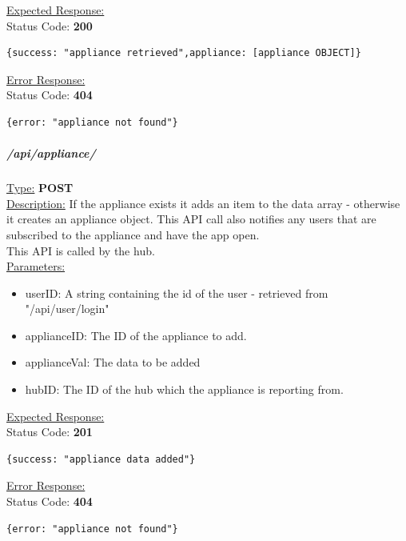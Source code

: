 \documentclass[preprint,12pt,3p]{elsarticle}
\newcommand{\forceindent}{\leavevmode{\parindent=1em\indent}}
\begin{document}
\underline{Expected Response:}\\[5pt]
\forceindent Status Code: \textbf{200} \\
\begin{verbatim}
{success: "appliance retrieved",appliance: [appliance OBJECT]}
\end{verbatim}
\underline{Error Response:}\\[5pt]
\forceindent Status Code: \textbf{404} \\
\begin{verbatim}
{error: "appliance not found"}
\end{verbatim}

\subparagraph*{/api/appliance/}
\underline{Type:} \textbf{POST}\\

\underline{Description:} If the appliance exists it adds an item to the data array - otherwise it creates an appliance object. This API call also notifies any users that are subscribed to the appliance and have the app open.\\
This API is called by the hub.\\

\underline{Parameters:}
\begin{itemize}
\item userID: A string containing the id of the user - retrieved from "/api/user/login"

\item applianceID: The ID of the appliance to add.

\item applianceVal: The data to be added

\item hubID: The ID of the hub which the appliance is reporting from.

\end{itemize}

\underline{Expected Response:}\\[5pt]
\forceindent Status Code: \textbf{201} \\
\begin{verbatim}
{success: "appliance data added"}
\end{verbatim}
\underline{Error Response:}\\[5pt]
\forceindent Status Code: \textbf{404} \\
\begin{verbatim}
{error: "appliance not found"}
\end{verbatim}
\end{document}
